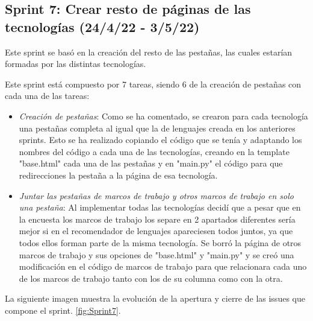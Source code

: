 \subsection{Sprint 7: Crear resto de páginas de las tecnologías (24/4/22 - 3/5/22)}
Este sprint se basó en la creación del resto de las pestañas, las cuales estarían formadas por las distintas tecnologías.

Este sprint está compuesto por 7 tareas, siendo 6 de la creación de pestañas con cada una de las tareas:
\begin{itemize}
    \item \textit{Creación de pestañas}: Como se ha comentado, se crearon para cada tecnología una pestañas completa al igual que la de lenguajes creada en los anteriores sprints. Esto se ha realizado copiando el código que se tenía y adaptando los nombres del código a cada una de las tecnologías, creando en la template "base.html" cada una de las pestañas y en "main.py" el código para que redirecciones la pestaña a la página de esa tecnología.
    
    \item \textit{Juntar las pestañas de marcos de trabajo y otros marcos de trabajo en solo una pestaña}: Al implementar todas las tecnologías decidí que a pesar que en la encuesta los marcos de trabajo los separe en 2 apartados diferentes sería mejor si en el recomendador de lenguajes apareciesen todos juntos, ya que todos ellos forman parte de la misma tecnología. Se borró la página de otros marcos de trabajo y sus opciones de "base.html" y "main.py" y se creó una modificación en el código de marcos de trabajo para que relacionara cada uno de los marcos de trabajo tanto con los de su columna como con la otra.
\end{itemize}

La siguiente imagen muestra la evolución de la apertura y cierre de las issues que compone el sprint. \ref{fig:Sprint7}.


